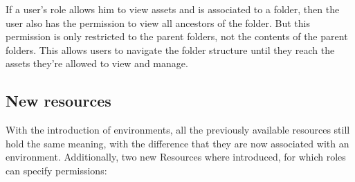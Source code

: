 
If a user's role allows him to view assets and is associated to a folder, then the user
also has the permission to view all ancestors of the folder.
But this permission is only restricted to the parent folders, not the contents of the parent folders.
This allows users to navigate the folder structure until they reach the assets they're
allowed to view and manage.


\subsection{New resources}

With the introduction of environments, all the previously available resources still hold
the same meaning, with the difference that they are now associated with an environment.
Additionally, two new Resources where introduced, for which roles can specify permissions:

